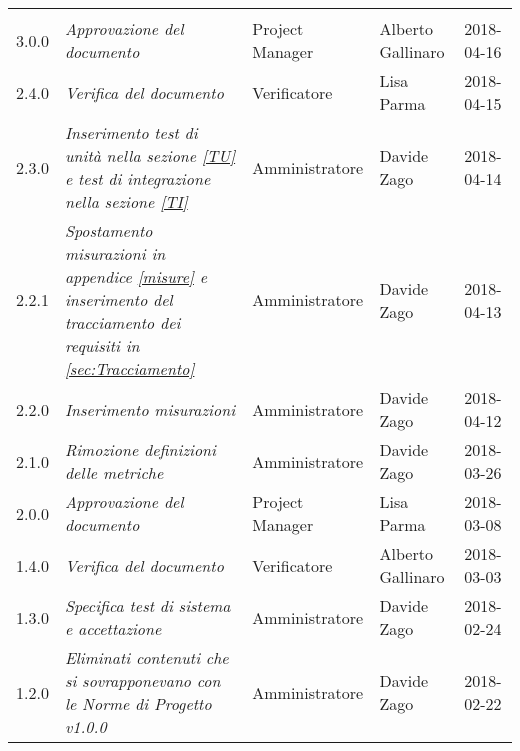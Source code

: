 
\section*{}

	\begin{longtable}[H]{C{2cm}|C{4cm}|C{3cm}|C{3cm}|R{2cm}}
		
		 & & & & \\
		
			3.0.0 & \emph{Approvazione del documento} & Project Manager & Alberto Gallinaro & 2018-04-16 \\
		\hline
		
		2.4.0 & \emph{Verifica del documento} & Verificatore &  Lisa Parma & 2018-04-15\\
		\hline
		
		2.3.0 & \emph{Inserimento test di unità nella sezione \ref{TU}  e test di integrazione nella sezione \ref{TI}} & Amministratore & Davide Zago & 2018-04-14 \\
		\hline
		
		2.2.1 & \emph{Spostamento misurazioni in appendice \ref{misure} e inserimento del tracciamento dei requisiti in \ref{sec:Tracciamento}} & Amministratore & Davide Zago & 2018-04-13 \\
		\hline
		
		2.2.0 & \emph{Inserimento misurazioni} & Amministratore & Davide Zago & 2018-04-12 \\
		\hline
		
		2.1.0 & \emph{Rimozione definizioni delle metriche} & Amministratore & Davide Zago & 2018-03-26 \\
		\hline

		2.0.0 & \emph{Approvazione del documento} & Project Manager & Lisa Parma & 2018-03-08 \\
		\hline
		
		1.4.0 & \emph{Verifica del documento} & Verificatore &  Alberto Gallinaro & 2018-03-03\\
		\hline
		
		1.3.0 & \emph{Specifica test di sistema e accettazione} & Amministratore &  Davide Zago & 2018-02-24 \\
		\hline
		
		1.2.0 & \emph{Eliminati contenuti che si sovrapponevano con le Norme di Progetto v1.0.0} & Amministratore &  Davide Zago & 2018-02-22 \\
		\hline
		

\end{longtable}
